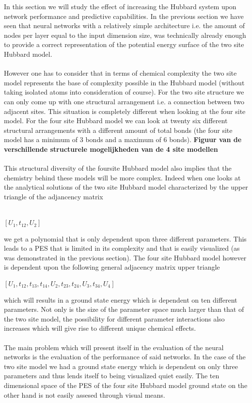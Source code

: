 \documentclass[]{article}
\begin{document}
In this section we will study the effect of increasing the Hubbard system upon network performance and predictive capabilities. In the previous section we have seen that neural networks with a relatively simple architecture i.e. the amount of nodes per layer equal to the input dimension size, was technically already enough to provide a correct representation of the potential energy surface of the two site Hubbard model.
\\
\\
However one has to consider that in terms of chemical complexity the two site model represents the base of complexity possible in the Hubbard model (without taking isolated atoms into consideration of course). For the two site structure we can only come up with one structural arrangement i.e. a connection between two adjacent sites. This situation is completely different when looking at the four site model. For the four site Hubbard model we can look at twenty six different structural arrangements with a different amount of total bonds (the four site model has a minimum of 3 bonds and a maximum of 6 bonds).
\textbf{Figuur van de verschillende structurele mogelijkheden van de 4 site modellen}
\\
\\
This structural diversity of the foursite Hubbard model also implies that the chemistry behind these models will be more complex. Indeed when one looks at the analytical solutions of the two site Hubbard model characterized by the upper triangle of the adjancency matrix 
\\
\\
\begin{center}
	$\left[ U_1 , t_{12}, U_2 \right]$
\end{center}
we get a polynomial that is only dependent upon three different parameters. This leads to a PES that is limited in its complexity and that is easily visualized (as was demonstrated in the previous section). The four site Hubbard model however is dependent upon the following general adjacency matrix upper triangle 
\begin{center}
	$\left[ U_1 , t_{12}, t_{13}, t_{14}, U_2, t_{23}, t_{24}, U_3, t_{34},U_4 \right]$
\end{center}
which will results in a ground state energy which is dependent on ten different parameters. Not only is the size of the parameter space much larger than that of the two site model, the possibility for different parameter interactions also increases which will give rise to different unique chemical effects.
\\
\\
The main problem which will present itself in the evaluation of the neural networks is the evaluation of the performance of said networks. In the case of the two site model we had a ground state energy which is dependent on only three parameters and thus lends itself to being visualized quiet easily. The ten dimensional space of the PES of the four site Hubbard model ground state on the other hand is not easily assesed through visual means.
\end{document}
